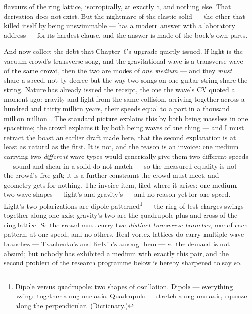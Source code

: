 \documentclass[fontsize=11pt,paper=a4,pagesize=auto,parskip=half-]{scrbook}
\begin{document}
flavours of the ring lattice, isotropically, at exactly $c$, and nothing else. That derivation does not exist. But the nightmare of the elastic solid --- the ether that killed itself by being unswimmable --- has a modern answer with a laboratory address --- for its hardest clause, and the answer is made of the book's own parts.

And now collect the debt that Chapter~6's upgrade quietly issued. If light is the vacuum-crowd's transverse song, and the gravitational wave is a transverse wave of the same crowd, then the two are modes of \emph{one medium} --- and they \emph{must} share a speed, not by decree but the way two songs on one guitar string share the string. Nature has already issued the receipt, the one the wave's CV quoted a moment ago: gravity and light from the same collision, arriving together across a hundred and thirty million years, their speeds equal to a part in a thousand million million~\cite{ligo2017}. The standard picture explains this by both being massless in one spacetime; the crowd explains it by both being waves of one thing --- and I must retract the boast an earlier draft made here, that the second explanation is at least as natural as the first. It is not, and the reason is an invoice: one medium carrying two \emph{different} wave types would generically give them two different speeds --- sound and shear in a solid do not match --- so the measured equality is not the crowd's free gift; it is a further constraint the crowd must meet, and geometry gets for nothing. The invoice item, filed where it arises: one medium, two wave-shapes --- light's and gravity's --- and no reason yet for one speed. Light's two polarizations are dipole-patterned\footnote{Dipole versus quadrupole: two shapes of oscillation. Dipole --- everything swings together along one axis. Quadrupole --- stretch along one axis, squeeze along the perpendicular. (Dictionary.)} --- the ring of test charges swings together along one axis; gravity's two are the quadrupole plus and cross of the ring lattice. So the crowd must carry two \emph{distinct transverse branches}, one of each pattern, at one speed, and no others. Real vortex lattices do carry multiple wave branches --- Tkachenko's and Kelvin's among them --- so the demand is not absurd; but nobody has exhibited a medium with exactly this pair, and the second problem of the research programme below is hereby sharpened to say so.
\end{document}
